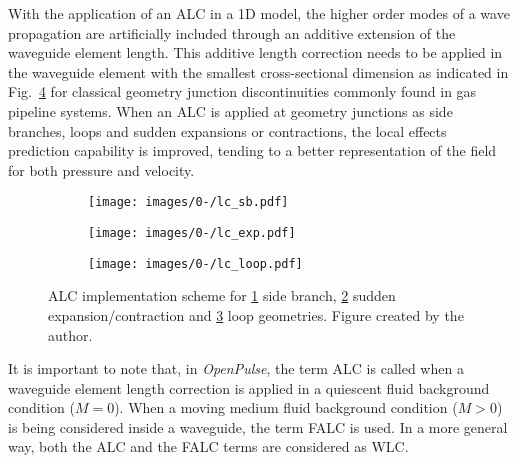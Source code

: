 \documentclass[12pt]{article}
\begin{document}
With the application of an \acrfull{ALC} in a 1D model, the higher order modes of a wave propagation are artificially included through an additive extension of the waveguide element length. This additive length correction needs to be applied in the waveguide element with the smallest cross-sectional dimension \cite{nijhofthesis2010, mareze_jsv} as indicated in Fig.~\ref{fig:lc_scheme} for classical geometry junction discontinuities commonly found in gas pipeline systems.  When an \acrshort{ALC} is applied at geometry junctions as side branches, loops and sudden expansions or contractions, the local effects prediction capability is improved, tending to a better representation of the field
for both pressure and velocity.


\begin{figure}[ht!]
	\centering
	\begin{subfigure}[b]{0.3\textwidth}
		\centering
		\texttt{[image: images/0-/lc\_sb.pdf]}
		\caption{}
		\label{fig:lc_sb_scheme}
	\end{subfigure}
	\hspace{-1mm}
	\begin{subfigure}[b]{0.3\textwidth}
		\centering
		\texttt{[image: images/0-/lc\_exp.pdf]}
		\caption{}
		\label{fig:lc_exp_scheme}
	\end{subfigure}
	\hspace{5mm}
	\begin{subfigure}[b]{0.3\textwidth}
		\centering
		\texttt{[image: images/0-/lc\_loop.pdf]}
		\caption{}
		\label{fig:lc_loop_scheme}
	\end{subfigure}
	\caption{\acrshort{ALC} implementation scheme for \ref{fig:lc_sb_scheme} side branch, \ref{fig:lc_exp_scheme} sudden expansion/contraction and \ref{fig:lc_loop_scheme} loop geometries. Figure created by the author.}
	\label{fig:lc_scheme}
\end{figure}

It is important to note that, in \textit{OpenPulse}, the term \acrshort{ALC} is called when a waveguide element length correction is applied in a quiescent fluid background condition ($M=$0). When a moving medium fluid background condition ($M>$0) is being considered inside a waveguide, the term \acrfull{FALC} is used. In a more general way, both the \acrshort{ALC} and the \acrshort{FALC} terms are considered as \acrfull{WLC}.
\end{document}
